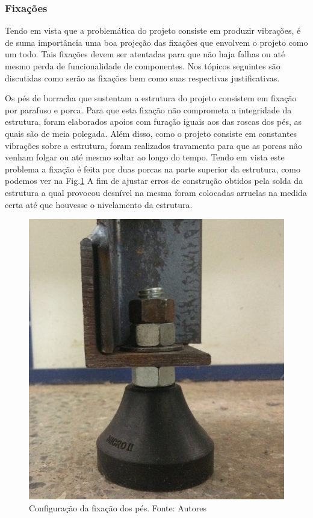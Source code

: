 \subsubsection*{\textbf{Fixações}}

    Tendo em vista que a problemática do projeto consiste em produzir vibrações, é de suma importância uma boa projeção das fixações que envolvem o projeto como um todo. Tais fixações devem ser atentadas para que não haja falhas ou até mesmo perda de funcionalidade de componentes. Nos tópicos seguintes são discutidas como serão as fixações bem como suas respectivas justificativas.


    Os pés de borracha que sustentam a estrutura do projeto consistem em fixação por parafuso e porca. Para que esta fixação não comprometa a integridade da estrutura, foram elaborados apoios com furação iguais aos das roscas dos pés, as quais são de meia polegada. Além disso, como o projeto consiste em constantes vibrações sobre a estrutura, foram realizados travamento para que as porcas não venham folgar ou até mesmo soltar ao longo do tempo. Tendo em vista este problema a fixação é feita por duas porcas na parte superior da estrutura, como podemos ver na Fig.\ref{fig:config_pes} A fim de ajustar erros de construção obtidos pela solda da estrutura a qual provocou desnível na mesma foram colocadas arruelas na medida certa até que houvesse o nivelamento da estrutura.

    \begin{figure}[H]
      \centering
      \includegraphics[scale=0.4]{figuras/config_pes_jpg.png}
      \caption{Configuração da fixação dos pés. Fonte: Autores}
      \label{fig:config_pes}
      \end{figure}


